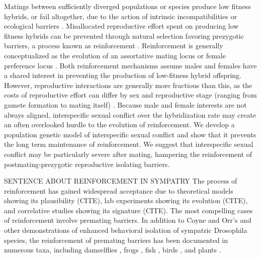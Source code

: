 \documentclass[11pt]{article}
\begin{document}
Matings between sufficiently diverged populations or species produce low fitness hybrids, or fail altogether, due to the action of intrinsic incompatibilities \citep{dobzhansky1937, muller1942} or ecological barriers \citep{schluter1998}. %
Misallocated reproductive effort spent on producing low fitness hybrids can be prevented through natural selection favoring prezygotic barriers, a process known as reinforcement \citep{dobzhansky1937, servedio2003}.
Reinforcement is generally conceptualized as the evolution of an assortative mating locus \citep{felsenstein1981} or female preference locus \citep{servedio1997}.   
Both reinforcement mechanisms assume males and females have a shared interest in preventing the production of low-fitness hybrid offspring. 
However, reproductive interactions are generally more fractious than this, as the costs of reproductive effort can differ by sex and reproductive stage (ranging from gamete formation to mating itself) \citep{arnqvistandrowebook}.  
Because male and female interests are not always aligned, interspecific sexual conflict over the hybridization rate \citep{parker1998}  may create an often overlooked hurdle to the evolution of reinforcement.   
We develop a population genetic model of interspecific sexual conflict and show that it prevents the long term maintenance of reinforcement.  
We suggest that interspecific sexual conflict may be particularly severe after mating, hampering the reinforcement of postmating-prezygotic reproductive isolating barriers.  

SENTENCE ABOUT REINFORCEMENT IN SYMPATRY
The process of reinforcement has gained widespread acceptance due to theoretical models showing its plausibility (CITE), lab experiments showing its evolution (CITE), and correlative studies showing its signature (CITE).  
The most compelling cases of reinforcement involve premating barriers. 
In addition to Coyne and Orr's \citeyearpar{coyneandorrbook} and other \citeyearpar{coyneandorr1989, coyneandorr1997} demonstrations of enhanced behavioral isolation of sympatric Drosophila species, the reinforcement of premating barriers has been documented in numerous taxa, including damselflies \citep{waage1979},  frogs \citep{blair1974, littlejohn1968, hobel2003}, fish \citep{rundle1998}, birds \citep{ratcliffe1983,saetre1997}, and plants \citep{hopkins2013}. %
\end{document}
